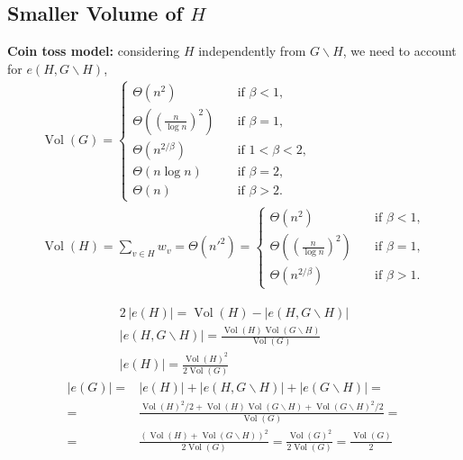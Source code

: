 \documentclass{beamer}
\DeclareMathOperator*{\Vol}{Vol}
\newcommand{\autotitle}{\secname\ifdefempty{\subsecname}{}{~--- \subsecname}}
\newcommand{\smalldisplayskips}{
    \setlength{\abovedisplayskip}{3pt}
    \setlength{\belowdisplayskip}{3pt}}
\begin{document}
\subsection{Smaller Volume of \texorpdfstring{$H$}{H}}

\begin{frame}{\autotitle}
    \small\smalldisplayskips
    \textbf{Coin toss model:} considering $H$ independently from $G\backslash H$,
    we need to account for $e(H,G\backslash H)$,
    \begin{gather*}
        \Vol(G)=\begin{cases}
            \Theta\left(n^2\right) & \quad \text{if } \beta<1,\\
            \Theta\left(\left(\frac{n}{\log n}\right)^2\right) & \quad \text{if } \beta=1,\\
            \Theta\left(n^{2/\beta}\right) & \quad \text{if } 1<\beta<2,\\
            \Theta\left(n\log n\right) & \quad \text{if } \beta=2,\\
            \Theta\left(n\right) & \quad \text{if } \beta>2.
        \end{cases}\\
            \Vol(H)=\sum_{v\in H}{w_v}=\Theta\left(n'^2\right)=\begin{cases}
            \Theta\left(n^2\right) & \quad \text{if } \beta<1,\\
            \Theta\left(\left(\frac{n}{\log n}\right)^2\right) & \quad \text{if } \beta=1,\\
            \Theta\left(n^{2/\beta}\right) & \quad \text{if } \beta>1.
        \end{cases}
    \end{gather*}
\end{frame}

\begin{frame}{\autotitle}
    \begin{gather*}
        2\,|e(H)|=\Vol(H)-|e(H,G\backslash H)|\\
        |e(H,G\backslash H)|=\frac{\Vol(H)\Vol(G\backslash H)}{\Vol(G)}\\
        |e(H)|=\frac{\Vol(H)^2}{2\Vol(G)}
    \end{gather*}
    \begin{equation*}
        \begin{split}
            |e(G)|=&|e(H)|+|e(H,G\backslash H)|+|e(G\backslash H)|=\\
            =&\frac{\Vol(H)^2/2+\Vol(H)\Vol(G\backslash H)+\Vol(G\backslash H)^2/2}{\Vol(G)}=\\
            =&\frac{(\Vol(H)+\Vol(G\backslash H))^2}{2\Vol(G)}
            =\frac{\Vol(G)^2}{2\Vol(G)}=\frac{\Vol(G)}{2}
        \end{split}
    \end{equation*}
\end{frame}
\end{document}
